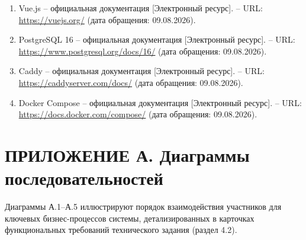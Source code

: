 \begin{enumerate}
        URL: \url{https://docs.pydantic.dev/} (дата обращения: 09.08.2026).
  \item Vue.js -- официальная документация [Электронный ресурс]. --
        URL: \url{https://vuejs.org/} (дата обращения: 09.08.2026).
  \item PostgreSQL 16 -- официальная документация [Электронный
        ресурс]. -- URL: \url{https://www.postgresql.org/docs/16/} (дата
        обращения: 09.08.2026).
  \item Caddy -- официальная документация [Электронный ресурс]. --
        URL: \url{https://caddyserver.com/docs/} (дата обращения:
        09.08.2026).
  \item Docker Compose -- официальная документация [Электронный
        ресурс]. -- URL: \url{https://docs.docker.com/compose/} (дата
        обращения: 09.08.2026).
\end{enumerate}

\clearpage
\renewcommand{\thefigure}{А.\arabic{figure}}
\setcounter{figure}{0}
\section*{ПРИЛОЖЕНИЕ А. Диаграммы последовательностей}

Диаграммы А.1--А.5 иллюстрируют порядок взаимодействия участников для ключевых бизнес-процессов системы, детализированных в карточках функциональных требований технического задания (раздел 4.2).

